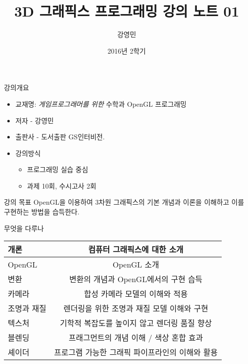 \documentclass{beamer}
\title[3D 그래픽스 프로그래밍]{3D 그래픽스 프로그래밍 강의 노트 01}
\author{강영민}
\institute{동명대학교}
\date{2016년 2학기}
\begin{document}
\begin{frame}
  \titlepage
\end{frame}



\begin{frame}{강의개요}
\begin{itemize}
  \item 교재명: {\small \it 게임프로그래머를 위한} 수학과 OpenGL 프로그래밍
  \item 저자 - 강영민
  \item 출판사 -  도서출판 GS인터비전.
  \item 강의방식
    \begin{itemize}
      \item 프로그래밍 실습 중심 
      \item 과제 10회, 수시고사 2회
    \end{itemize} 
\end{itemize}

\begin{block}{강의 목표}
OpenGL을 이용하여 3차원 그래픽스의 기본 개념과 이론을 이해하고 이를 구현하는 방법을 습득한다.
\end{block}

\end{frame}


\begin{frame}{무엇을 다루나}


\begin{table}
\centering
\begin{tabular}{l|c}  \hline
개론 & 컴퓨터 그래픽스에 대한 소개 \\\hline  \hline
OpenGL & OpenGL 소개 \\ \hline
변환 & 변환의 개념과 OpenGL에서의 구현 습득 \\ \hline
카메라 & 합성 카메라 모델의 이해와 적용\\ \hline
조명과 재질 & 렌더링을 위한 조명과 재질 모델 이해와 구현 \\ \hline
텍스처 & 기학적 복잡도를 높이지 않고 렌더링 품질 향상 \\ \hline
블렌딩 & 프래그먼트의 개념 이해 / 색상 혼합 효과 \\ \hline
셰이더 & 프로그램 가능한 그래픽 파이프라인의 이해와 활용 \\ \hline
\end{tabular}
\end{table}

\end{frame}
\end{document}
